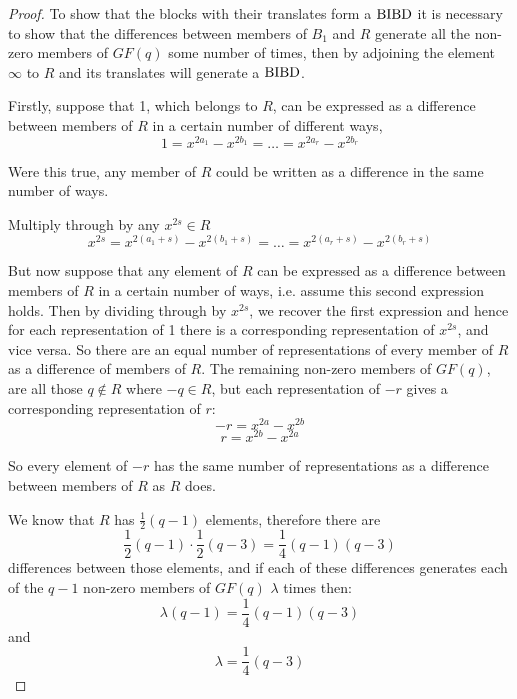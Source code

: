 \begin{proof}
To show that the blocks with their translates form a $\operatorname{BIBD}$ it is necessary to show that the differences between members of $B_1$ and $R$ generate all the non-zero members of $GF(q)$ some number of times, then by adjoining the element $\infty$ to $R$ and its translates will generate a $\operatorname{BIBD}$.

Firstly, suppose that 1, which belongs to $R$, can be expressed as a difference between members of $R$ in a certain number of different ways,
\begin{equation}
1 = x^{2a_1} - x^{2b_1} = \ldots = x^{2a_r} - x^{2b_r}
\end{equation}

Were this true, any member of $R$ could be written as a difference in the same number of ways.

Multiply through by any $x^{2s} \in R$
\begin{equation}
x^{2s} = x^{2(a_1 + s)} - x^{2(b_1 + s)} = \ldots = x^{2(a_r + s)} - x^{2(b_r + s)}
\end{equation}

But now suppose that any element of $R$ can be expressed as a difference between members of $R$ in a certain number of ways, i.e. assume this second expression holds.
Then by dividing through by $x^{2s}$, we recover the first expression and hence for each representation of 1 there is a corresponding representation of $x^{2s}$, and vice versa.
So there are an equal number of representations of every member of $R$ as a difference of members of $R$.
The remaining non-zero members of $GF(q)$, are all those $q \notin R$ where $-q \in R$, but each representation of $-r$ gives a corresponding representation of $r$:
\begin{equation}
-r = x^{2a} - x^{2b}
\end{equation}
\begin{equation}
r = x^{2b} - x^{2a}
\end{equation}

So every element of $-r$ has the same number of representations as a difference between members of $R$ as $R$ does.

We know that $R$ has $\frac{1}{2}(q-1)$ elements, therefore there are
\begin{equation}
\frac{1}{2}(q-1) \cdot \frac{1}{2} (q-3) = \frac{1}{4}(q-1)(q-3)
\end{equation}
differences between those elements,
and if each of these differences generates each of the $q-1$ non-zero members of $GF(q)$ $\lambda$ times then:
\begin{equation}
\lambda(q - 1) = \frac{1}{4}(q - 1)(q - 3)
\end{equation}
and
\begin{equation}
\lambda = \frac{1}{4}(q - 3)
\end{equation}


\end{proof}
